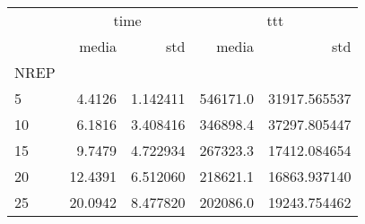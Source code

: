 \begin{tabular}{lrrrr}
\toprule
{} & \multicolumn{2}{c}{time} & \multicolumn{2}{c}{ttt} \\
{} &    media &       std &     media &           std \\
NREP &          &           &           &               \\
\midrule
5    &   4.4126 &  1.142411 &  546171.0 &  31917.565537 \\
10   &   6.1816 &  3.408416 &  346898.4 &  37297.805447 \\
15   &   9.7479 &  4.722934 &  267323.3 &  17412.084654 \\
20   &  12.4391 &  6.512060 &  218621.1 &  16863.937140 \\
25   &  20.0942 &  8.477820 &  202086.0 &  19243.754462 \\
\bottomrule
\end{tabular}
